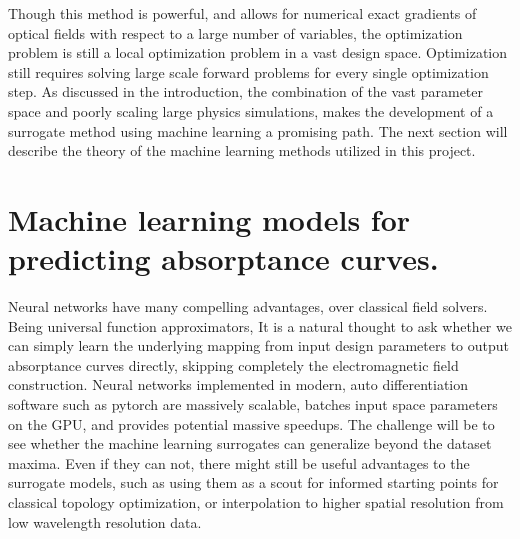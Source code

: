 Though this method is powerful, and allows for numerical exact gradients of optical fields with respect to a large number of variables, the optimization problem is still a local optimization problem in a vast design space.
Optimization still requires solving large scale forward problems for every single optimization step. As discussed in the introduction, the combination of the vast parameter space and poorly scaling large physics simulations, makes the development of a surrogate method using machine learning a promising path.
The next section will describe the theory of the machine learning methods utilized in this project.

\section{Machine learning models for predicting absorptance curves.}
Neural networks have many compelling advantages, over classical field solvers. Being universal function approximators, It is a natural thought to ask whether we can simply learn the underlying mapping from input design parameters to output absorptance curves directly, skipping completely the electromagnetic field construction.
Neural networks implemented in modern, auto differentiation software such as pytorch are massively scalable, batches input space parameters on the GPU, and provides potential massive speedups. The challenge will be to see whether the machine learning surrogates can generalize beyond the dataset maxima. Even if they can not, there might still be useful advantages to the surrogate models, such as using them as a scout for informed starting points for classical topology optimization, or
interpolation to higher spatial resolution from low wavelength resolution data.